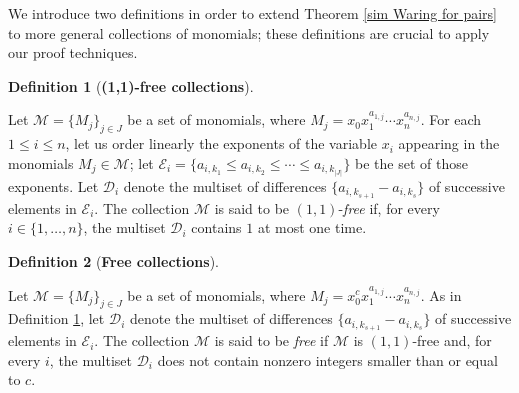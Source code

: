 \documentclass{amsart}
\theoremstyle{plain}
\theoremstyle{definition}
\newtheorem{definition}{Definition}[section]
\theoremstyle{remark}
\begin{document}
We introduce two definitions in order to extend Theorem \ref{sim Waring for pairs} to more general collections of monomials; these definitions are crucial to apply our proof techniques.

\begin{definition}[{\bf (1,1)-free collections}]\label{(1,1)free}

Let $\mathcal M= \lbrace M_j\rbrace_{j\in J}$ be a set of monomials, where $M_j=x_0x_1^{a_{1,j}}\cdots x_n^{a_{n,j}}$.  For each $1\leq i\leq n$, let us order linearly the exponents of the variable $x_i$ appearing in the monomials $M_j\in \mathcal M$; let $\mathcal E_i = \lbrace a_{i,k_1}\leq a_{i,k_2}\leq \cdots \leq a_{i,k_{|J|}}\rbrace$ be the set of those exponents. Let $\mathcal D_i$ denote the multiset of differences $\lbrace a_{i,k_{s+1}} - a_{i,k_{s}} \rbrace$ of successive elements in $\mathcal E_i$. The collection $\mathcal M$ is said to be $(1,1)$-{\it free} if, for every $i\in \lbrace 1,\ldots, n \rbrace$, the multiset $\mathcal D_i$ contains $1$ at most one time.

\end{definition}

\begin{definition}[{\bf Free collections}]\label{Free collection}

Let $\mathcal M= \lbrace M_j\rbrace_{j\in J}$ be a set of monomials, where $M_j=x_0^cx_1^{a_{1,j}}\cdots x_n^{a_{n,j}}$. As in Definition \ref{(1,1)free}, let $\mathcal D_i$ denote the multiset of differences  $\lbrace a_{i,k_{s+1}} - a_{i,k_{s}} \rbrace$ of successive elements in $\mathcal E_i$. The collection $\mathcal M$ is said to be {\it free} if $\mathcal M$ is $(1,1)$-free and, for every $i$, the multiset $\mathcal D_i$ does not contain nonzero integers smaller than or equal to $c$.

\end{definition}
\end{document}
